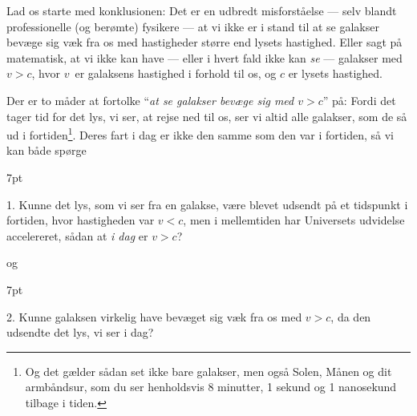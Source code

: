 \documentclass[useAMS,danish]{aa}
\def\vrec{\mbox{$v$}}
\newenvironment{formal}{%
  \def\FrameCommand{%
    \hspace{1pt}%
    {\color{blue}\vrule width 2pt}%
    {\color{formalshade}\vrule width 4pt}%
    \colorbox{formalshade}%
  }%
  \MakeFramed{\advance\hsize-\width\FrameRestore}%
  \noindent\hspace{-4.55pt}%
  \begin{adjustwidth}{}{7pt}%
  \vspace{2pt}\vspace{2pt}%
}
{%
  \vspace{2pt}\end{adjustwidth}\endMakeFramed%
}
\begin{document}





Lad os starte med konklusionen:
Det er en udbredt misforståelse --- selv blandt professionelle (og berømte) fysikere --- at vi ikke er i stand til at se galakser bevæge sig væk fra os med hastigheder større end lysets hastighed.
Eller sagt på matematisk, at vi ikke kan have --- eller i hvert fald ikke kan \emph{se} --- galakser med $\vrec > c$, hvor \vrec\ er galaksens hastighed i forhold til os, og $c$ er lysets hastighed.

Der er to måder at fortolke ``\emph{at se galakser bevæge sig med $\vrec>c$}'' på:
Fordi det tager tid for det lys, vi ser, at rejse ned til os, ser vi altid alle galakser, som de så ud i fortiden\footnote{Og det gælder sådan set ikke bare galakser, men også Solen, Månen og dit armbåndsur, som du ser henholdsvis 8 minutter, 1 sekund og 1 nanosekund tilbage i tiden.}.
Deres fart i dag er ikke den samme som den var i fortiden, så vi kan både spørge
\begin{formal}
    1. Kunne det lys, som vi ser fra en galakse, være blevet udsendt på et tidspunkt i fortiden, hvor hastigheden var $\vrec<c$, men i mellemtiden har Universets udvidelse accelereret, sådan at \emph{i dag} er $\vrec>c$?
\end{formal}
og
\begin{formal}
    2. Kunne galaksen virkelig have bevæget sig væk fra os med $\vrec>c$, da den udsendte det lys, vi ser i dag?
\end{formal}
\end{document}
